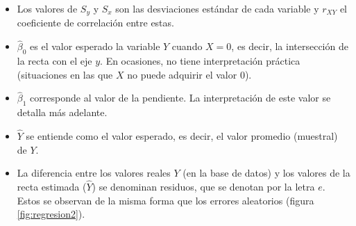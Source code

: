 \documentclass[
  11pt,
]{book}
\providecommand{\tightlist}{%
  \setlength{\itemsep}{0pt}\setlength{\parskip}{0pt}}
\theoremstyle{definition}
\theoremstyle{definition}
\theoremstyle{definition}
\theoremstyle{definition}
\theoremstyle{remark}
\begin{document}
\begin{itemize}
\tightlist
\item
  Los valores de \(S_y\) y \(S_x\) son las desviaciones estándar de cada variable y \(r_{XY}\) el coeficiente de correlación entre estas.
\item
  \(\widehat{\beta}_0\) es el valor esperado la variable \(Y\) cuando \(X = 0\), es decir, la intersección de la recta con el eje \(y\). En ocasiones, no tiene interpretación práctica (situaciones en las que \(X\) no puede adquirir el valor 0).
\item
  \(\widehat{\beta}_1\) corresponde al valor de la pendiente. La interpretación de este valor se detalla más adelante.
\item
  \(\widehat{Y}\) se entiende como el valor esperado, es decir, el valor promedio (muestral) de \(Y\).
\item
  La diferencia entre los valores reales \(Y\) (en la base de datos) y los valores de la recta estimada (\(\widehat{Y}\)) se denominan residuos, que se denotan por la letra \(e\). Estos se observan de la misma forma que los errores aleatorios (figura \ref{fig:regresion2}).
\end{itemize}
\end{document}
